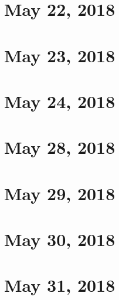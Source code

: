 \documentclass{article}
\begin{document}

\section{May 22, 2018}
\newpage


\section{May 23, 2018}
\newpage


\section{May 24, 2018}
\newpage


\section{May 28, 2018}
\newpage


\section{May 29, 2018}
\newpage


\section{May 30, 2018}
\newpage


\section{May 31, 2018}
\newpage

\end{document}
